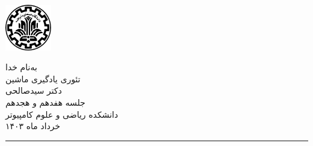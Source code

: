 \begin{minipage}{0.1\textwidth}
    \includegraphics[width=2cm]{etc/sut}
    \end{minipage}%
    \hspace{1.65cm}
    \begin{minipage}{0.5\textwidth}\centering
    \fontsize{10pt}{10pt}\selectfont
    به‌نام خدا \\
    تئوری یادگیری ماشین \\
    دکتر سیدصالحی \\
    جلسه هفدهم و هجدهم \\
    \vspace{0.25cm}
    \begingroup
    \fontsize{8pt}{8pt}\selectfont
    دانشکده ریاضی و علوم کامپیوتر \\
    خرداد ماه ۱۴۰۳ \\
    \endgroup
    \end{minipage}%
    \hfill%
    \begin{minipage}{0.1\textwidth}
    \end{minipage}
    
    \vspace{0.5cm}
    
    \noindent\rule{\textwidth}{1pt}